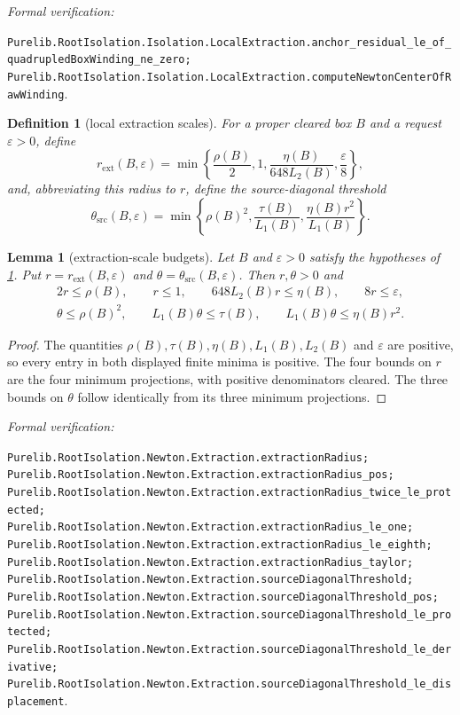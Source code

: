 \documentclass[11pt]{article}
\newtheorem{lemma}[theorem]{Lemma}
\newtheorem{definition}[theorem]{Definition}
\newcommand{\eps}{\varepsilon}
\newcommand{\leanref}[1]{\par\smallskip\noindent
  \emph{Formal verification:}\par\nobreak
  {\raggedright\nolinkurl{#1}.\par}}
\begin{document}
\leanref{Purelib.RootIsolation.Isolation.LocalExtraction.anchor_residual_le_of_quadrupledBoxWinding_ne_zero;
Purelib.RootIsolation.Isolation.LocalExtraction.computeNewtonCenterOfRawWinding}

\begin{definition}[local extraction scales]
\label{def:local-extraction-scales}
For a proper cleared box $B$ and a request $\eps>0$, define
\[
 r_{\mathrm{ext}}(B,\eps)=
 \min\left\{\frac{\rho(B)}2,1,
       \frac{\eta(B)}{648L_2(B)},\frac\eps8\right\},
\]
and, abbreviating this radius to $r$, define the source-diagonal threshold
\[
 \theta_{\mathrm{src}}(B,\eps)=
 \min\left\{\rho(B)^2,
       \frac{\tau(B)}{L_1(B)},
       \frac{\eta(B)r^2}{L_1(B)}\right\}.
\]
\end{definition}

\begin{lemma}[extraction-scale budgets]
\label{lem:local-extraction-scale-budgets}
Let $B$ and $\eps>0$ satisfy the hypotheses of
\cref{def:local-extraction-scales}.  Put $r=r_{\mathrm{ext}}(B,\eps)$ and
$\theta=\theta_{\mathrm{src}}(B,\eps)$.  Then $r,\theta>0$ and
\[
\begin{gathered}
 2r\le\rho(B),\qquad r\le1,\qquad
 648L_2(B)r\le\eta(B),\qquad 8r\le\eps,\\
 \theta\le\rho(B)^2,\qquad
 L_1(B)\theta\le\tau(B),\qquad
 L_1(B)\theta\le\eta(B)r^2.
\end{gathered}
\]
\end{lemma}

\begin{proof}
The quantities $\rho(B),\tau(B),\eta(B),L_1(B),L_2(B)$ and $\eps$ are
positive, so every entry in both displayed finite minima is positive.  The
four bounds on $r$ are the four minimum projections, with positive
denominators cleared.  The three bounds on $\theta$ follow identically from
its three minimum projections.
\end{proof}

\leanref{Purelib.RootIsolation.Newton.Extraction.extractionRadius;
Purelib.RootIsolation.Newton.Extraction.extractionRadius_pos;
Purelib.RootIsolation.Newton.Extraction.extractionRadius_twice_le_protected;
Purelib.RootIsolation.Newton.Extraction.extractionRadius_le_one;
Purelib.RootIsolation.Newton.Extraction.extractionRadius_le_eighth;
Purelib.RootIsolation.Newton.Extraction.extractionRadius_taylor;
Purelib.RootIsolation.Newton.Extraction.sourceDiagonalThreshold;
Purelib.RootIsolation.Newton.Extraction.sourceDiagonalThreshold_pos;
Purelib.RootIsolation.Newton.Extraction.sourceDiagonalThreshold_le_protected;
Purelib.RootIsolation.Newton.Extraction.sourceDiagonalThreshold_le_derivative;
Purelib.RootIsolation.Newton.Extraction.sourceDiagonalThreshold_le_displacement}
\end{document}
